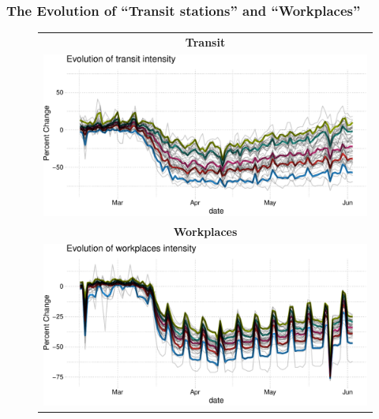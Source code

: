 \documentclass{beamer}
\begin{document}
\begin{frame}
  \frametitle{The Evolution of  ``Transit stations'' and ``Workplaces''}\vspace{-0.2cm}
\begin{figure} %
  \begin{minipage}{\linewidth}
    \begin{tabular}{c}
    \textbf{Transit}\\
      \includegraphics[width=0.6\linewidth]{../tables_and_figures/transit}\\ 
      \textbf{Workplaces}\\
      \includegraphics[width=0.6\linewidth]{../tables_and_figures/workplaces}
       \end{tabular}
       \end{minipage}
        \begin{flushleft}
      \end{flushleft}
\end{figure}
   
\end{frame}



\end{document}
